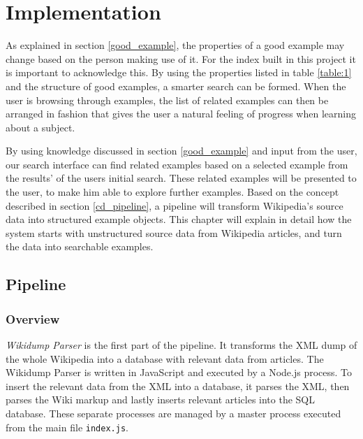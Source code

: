 
\chapter{Implementation}\label{cap_4}


As explained in section \ref{good_example}, the properties of a good example may change based on the person making use of it. For the index built in this project it is important to acknowledge this. By using the properties listed in table \ref{table:1} and the structure of good examples, a smarter search can be formed. When the user is browsing through examples, the list of related examples can then be arranged in fashion that gives the user a natural feeling of progress when learning about a subject.

By using knowledge discussed in section \ref{good_example} and input from the user, our search interface can find related examples based on a selected example from the results' of the users initial search. These related examples will be presented to the user, to make him able to explore further examples. Based on the concept described in section \ref{cd_pipeline}, a pipeline will transform Wikipedia's source data into structured example objects. This chapter will explain in detail how the system starts with unstructured source data from Wikipedia articles, and turn the data into searchable examples.

\section{Pipeline}

\subsection{Overview}


\textit{Wikidump Parser} is the first part of the pipeline. It transforms the XML dump of the whole Wikipedia into a database with relevant data from articles. The Wikidump Parser is written in JavaScript and executed by a Node.js process. To insert the relevant data from the XML into a database, it parses the XML, then parses the Wiki markup and lastly inserts relevant articles into the SQL database. These separate processes are managed by a master process executed from the main file \texttt{index.js}.


